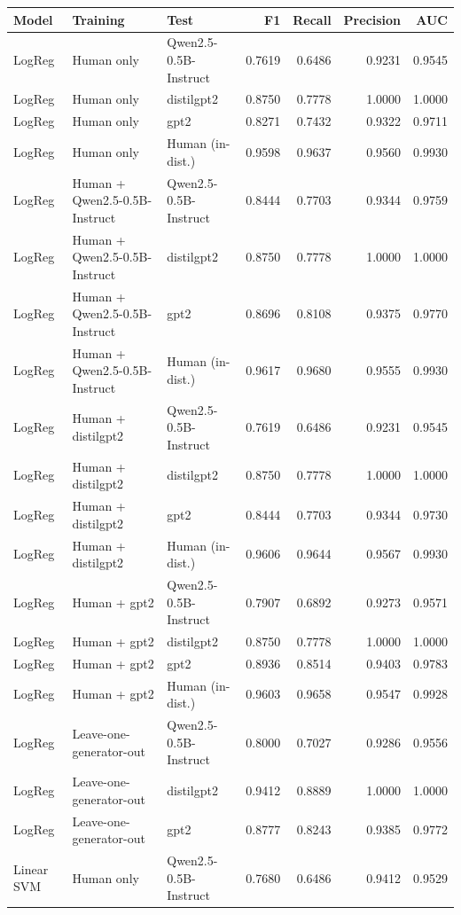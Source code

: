 \begin{tabular}{lllrrrr}
\toprule
Model & Training & Test & F1 & Recall & Precision & AUC \\
\midrule
LogReg & Human only & Qwen2.5-0.5B-Instruct & 0.7619 & 0.6486 & 0.9231 & 0.9545 \\
LogReg & Human only & distilgpt2 & 0.8750 & 0.7778 & 1.0000 & 1.0000 \\
LogReg & Human only & gpt2 & 0.8271 & 0.7432 & 0.9322 & 0.9711 \\
LogReg & Human only & Human (in-dist.) & 0.9598 & 0.9637 & 0.9560 & 0.9930 \\
LogReg & Human + Qwen2.5-0.5B-Instruct & Qwen2.5-0.5B-Instruct & 0.8444 & 0.7703 & 0.9344 & 0.9759 \\
LogReg & Human + Qwen2.5-0.5B-Instruct & distilgpt2 & 0.8750 & 0.7778 & 1.0000 & 1.0000 \\
LogReg & Human + Qwen2.5-0.5B-Instruct & gpt2 & 0.8696 & 0.8108 & 0.9375 & 0.9770 \\
LogReg & Human + Qwen2.5-0.5B-Instruct & Human (in-dist.) & 0.9617 & 0.9680 & 0.9555 & 0.9930 \\
LogReg & Human + distilgpt2 & Qwen2.5-0.5B-Instruct & 0.7619 & 0.6486 & 0.9231 & 0.9545 \\
LogReg & Human + distilgpt2 & distilgpt2 & 0.8750 & 0.7778 & 1.0000 & 1.0000 \\
LogReg & Human + distilgpt2 & gpt2 & 0.8444 & 0.7703 & 0.9344 & 0.9730 \\
LogReg & Human + distilgpt2 & Human (in-dist.) & 0.9606 & 0.9644 & 0.9567 & 0.9930 \\
LogReg & Human + gpt2 & Qwen2.5-0.5B-Instruct & 0.7907 & 0.6892 & 0.9273 & 0.9571 \\
LogReg & Human + gpt2 & distilgpt2 & 0.8750 & 0.7778 & 1.0000 & 1.0000 \\
LogReg & Human + gpt2 & gpt2 & 0.8936 & 0.8514 & 0.9403 & 0.9783 \\
LogReg & Human + gpt2 & Human (in-dist.) & 0.9603 & 0.9658 & 0.9547 & 0.9928 \\
LogReg & Leave-one-generator-out & Qwen2.5-0.5B-Instruct & 0.8000 & 0.7027 & 0.9286 & 0.9556 \\
LogReg & Leave-one-generator-out & distilgpt2 & 0.9412 & 0.8889 & 1.0000 & 1.0000 \\
LogReg & Leave-one-generator-out & gpt2 & 0.8777 & 0.8243 & 0.9385 & 0.9772 \\
Linear SVM & Human only & Qwen2.5-0.5B-Instruct & 0.7680 & 0.6486 & 0.9412 & 0.9529 \\

\end{tabular}

